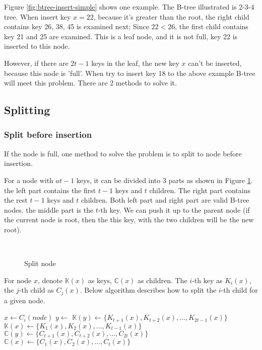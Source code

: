 \documentclass{article}
\begin{document}
Figure \ref{fig:btree-insert-simple} shows one example. The B-tree illustrated
is 2-3-4 tree. When insert key $x=22$, because it's greater than the root,
the right child contains key 26, 38, 45 is examined next; Since $22 < 26$,
the first child contains key 21 and 25 are examined. This is a leaf
node, and it is not full, key 22 is inserted to this node.

However, if there are $2t-1$ keys in the leaf, the new key $x$ can't
be inserted, because this node is 'full'. When try to insert key 18
to the above example B-tree will meet this problem. There are 2 methods to
solve it.

\subsection{Splitting}
\label{split}

\subsubsection{Split before insertion}

If the node is full, one method to solve the problem is to
split to node before insertion.

For a node with $at-1$ keys, it can be divided into 3 parts as shown in
Figure \ref{fig:node-split}. the left part contains the first $t-1$ keys
and $t$ children. The right part contains the rest $t-1$ keys
and $t$ children. Both left part and right part are valid B-tree
nodes. the middle part is the $t$-th key. We can push it up
to the parent node (if the current node is root, then the this key,
with the two children will be the new root).

\begin{figure}[htbp]
  \centering
   \\
  \caption{Split node}
  \label{fig:node-split}
\end{figure}

For node $x$, denote $\mathbb{K}(x)$
as keys, $\mathbb{C}(x)$ as children. The $i$-th key as $K_i(x)$, the $j$-th child
as $C_j(x)$. Below algorithm describes how to split the $i$-th child for a given node.

\begin{algorithmic}[1]
  \State $x \gets C_i(node)$
  \State $y \gets$ 
  \State {}
  \State {}
  \State $\mathbb{K}(y) \gets \{K_{t+1}(x), K_{t+2}(x), ..., K_{2t-1}(x)\}$
  \State $\mathbb{K}(x) \gets \{K_1(x), K_2(x), ..., K_{t-1}(x)\}$
    \State $\mathbb{C}(y) \gets \{C_{t+1}(x), C_{t+2}(x), ..., C_{2t}(x)\}$
    \State $\mathbb{C}(x) \gets \{C_1(x), C_2(x), ..., C_t(x)\}$
  \EndIf
\EndProcedure
\end{algorithmic}
\end{document}

